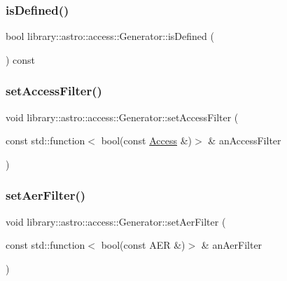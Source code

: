 \subsubsection{\texorpdfstring{is\+Defined()}{isDefined()}}
{\footnotesize\ttfamily bool library\+::astro\+::access\+::\+Generator\+::is\+Defined (\begin{DoxyParamCaption}{ }\end{DoxyParamCaption}) const}

\mbox{\label{classlibrary_1_1astro_1_1access_1_1_generator_a74992fd0314e87ffd4b47a2c7f20c646}} 
\subsubsection{\texorpdfstring{set\+Access\+Filter()}{setAccessFilter()}}
{\footnotesize\ttfamily void library\+::astro\+::access\+::\+Generator\+::set\+Access\+Filter (\begin{DoxyParamCaption}\item[{const std\+::function$<$ bool(const \hyperlink{classlibrary_1_1astro_1_1_access}{Access} \&)$>$ \&}]{an\+Access\+Filter }\end{DoxyParamCaption})}

\mbox{\label{classlibrary_1_1astro_1_1access_1_1_generator_a2676ec52653573cf1ff91876f671a679}} 
\subsubsection{\texorpdfstring{set\+Aer\+Filter()}{setAerFilter()}}
{\footnotesize\ttfamily void library\+::astro\+::access\+::\+Generator\+::set\+Aer\+Filter (\begin{DoxyParamCaption}\item[{const std\+::function$<$ bool(const A\+ER \&)$>$ \&}]{an\+Aer\+Filter }\end{DoxyParamCaption})}

